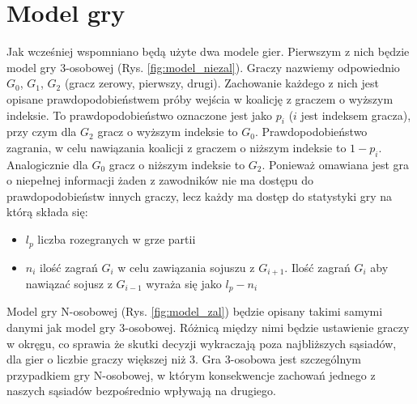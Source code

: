 \section{Model gry}
\label{sec:model}
Jak wcześniej wspomniano będą użyte dwa modele gier. Pierwszym z nich będzie model gry 3-osobowej (Rys. \ref{fig:model_niezal}). Graczy nazwiemy odpowiednio $G_0$, $G_1$, $G_2$ (gracz zerowy, pierwszy, drugi). Zachowanie każdego z nich jest opisane prawdopodobieństwem próby wejścia w koalicję z graczem o wyższym indeksie. To prawdopodobieństwo oznaczone jest jako $p_i$ ($i$ jest indeksem gracza), przy czym dla $G_2$ gracz o wyższym indeksie to $G_0$. Prawdopodobieństwo zagrania, w celu nawiązania koalicji z graczem o niższym indeksie to $1 - p_i$. Analogicznie dla $G_0$ gracz o niższym indeksie to $G_2$. Ponieważ omawiana jest gra o niepełnej informacji żaden z zawodników nie ma dostępu do prawdopodobieństw innych graczy, lecz każdy ma dostęp do statystyki gry na którą składa się:
\begin{itemize}
\item $l_p$ liczba rozegranych w grze partii
\item $n_i$ ilość zagrań $G_i$ w celu zawiązania sojuszu z $G_{i+1}$. Ilość zagrań $G_{i}$ aby nawiązać sojusz z $G_{i-1}$ wyraża się jako $l_p - n_i$
\end{itemize}
Model gry N-osobowej (Rys. \ref{fig:model_zal}) \cite{Fsmd} będzie opisany takimi samymi danymi jak model gry 3-osobowej. Różnicą między nimi będzie ustawienie graczy w okręgu, co sprawia że skutki decyzji wykraczają poza najbliższych sąsiadów, dla gier o liczbie graczy większej niż 3. Gra 3-osobowa jest szczególnym przypadkiem gry N-osobowej, w którym konsekwencje zachowań jednego z naszych sąsiadów bezpośrednio wpływają na drugiego.
